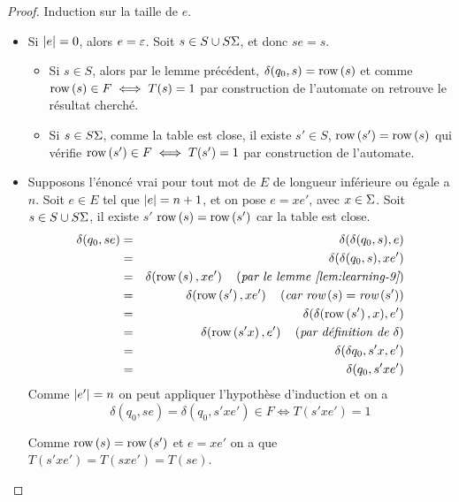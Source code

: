 \begin{proof}

	Induction sur la taille de $e$.

	\begin{itemize}
		\item Si $|e| = 0$, alors $e = \varepsilon$.
		      Soit $s \in S \cup S \Sigma$, et donc $se = s$.
		      \begin{itemize}
			      \item Si $s \in S$, alors par le lemme précédent,
			            $\delta(q_0, s) = \text{row}\left(s\right)$ et
			            comme $\text{row}\left(s\right) \in F \iff T(s) = 1$ par construction de l'automate on retrouve le résultat cherché.
			      \item Si $s \in S\Sigma$, comme la table est close, il existe $s' \in S$, \tq $\text{row}\left(s'\right) = \text{row}\left(s\right)$ qui vérifie
			            $\text{row}\left(s'\right) \in F \iff T(s') = 1$ par construction de l'automate.

		      \end{itemize}
		\item Supposons l'énoncé vrai pour tout mot de $E$ de longueur inférieure ou égale a $n$. Soit $e \in E$ tel que $|e| = n + 1$,
		      et on pose $e = x e'$, avec $x \in \Sigma$. Soit $s \in S \cup S\Sigma$, il existe
		      $s'$ \tq $\text{row}\left(s\right) = \text{row}\left(s'\right)$ car la table est close.
		      \begin{eqnarray*}
			      \delta(q_0, se) &=& \delta(\delta(q_0,s),e) \\
			      &=& \delta(\delta(q_0,s),xe') \\
			      &=& \delta(\text{row}\left(s\right),xe') \quad\left(\textit{par le lemme \ref{lem:learning-9}}\right) \\
			      &=& \delta(\text{row}\left(s'\right),xe') \quad\left(\textit{car $\text{row}\left(s\right) = \text{row}\left(s'\right)$}\right) \\
			      &=& \delta(\delta (\text{row}\left(s'\right), x), e') \\
			      &=& \delta(\text{row}\left(s'x\right), e') \quad\left(\textit{par définition de $\delta$}\right)\\
			      &=& \delta(\delta{q_0, s'x}, e') \\
			      &=& \delta(q_0, s'x e')
		      \end{eqnarray*}
		      Comme $|e'| = n$ on peut appliquer l'hypothèse d'induction et on a
		      $$ \delta(q_0, se) = \delta(q_0, s'x e') \in F \iff T(s'x e') = 1$$

		      Comme $\text{row}\left(s\right) = \text{row}\left(s'\right)$  et $e = xe'$ on a que $T(s'xe') = T(sxe') = T(se)$.
	\end{itemize}
\end{proof}

